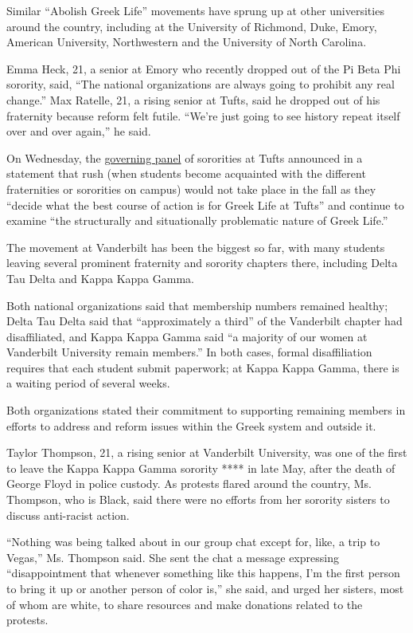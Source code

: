 Similar ``Abolish Greek Life'' movements have sprung up at other
universities around the country, including at the University of
Richmond, Duke, Emory, American University, Northwestern and the
University of North Carolina.

Emma Heck, 21, a senior at Emory who recently dropped out of the Pi Beta
Phi sorority, said, ``The national organizations are always going to
prohibit any real change.'' Max Ratelle, 21, a rising senior at Tufts,
said he dropped out of his fraternity because reform felt futile.
``We're just going to see history repeat itself over and over again,''
he said.

On Wednesday, the
\href{https://www.instagram.com/p/CDPpAbbFJSc/}{governing panel} of
sororities at Tufts announced in a statement that rush (when students
become acquainted with the different fraternities or sororities on
campus) would not take place in the fall as they ``decide what the best
course of action is for Greek Life at Tufts'' and continue to examine
``the structurally and situationally problematic nature of Greek Life.''

The movement at Vanderbilt has been the biggest so far, with many
students leaving several prominent fraternity and sorority chapters
there, including Delta Tau Delta and Kappa Kappa Gamma.

Both national organizations said that membership numbers remained
healthy; Delta Tau Delta said that ``approximately a third'' of the
Vanderbilt chapter had disaffiliated, and Kappa Kappa Gamma said ``a
majority of our women at Vanderbilt University remain members.'' In both
cases, formal disaffiliation requires that each student submit
paperwork; at Kappa Kappa Gamma, there is a waiting period of several
weeks.

Both organizations stated their commitment to supporting remaining
members in efforts to address and reform issues within the Greek system
and outside it.

Taylor Thompson, 21, a rising senior at Vanderbilt University, was one
of the first to leave the Kappa Kappa Gamma sorority **** in late May,
after the death of George Floyd in police custody. As protests flared
around the country, Ms. Thompson, who is Black, said there were no
efforts from her sorority sisters to discuss anti-racist action.

``Nothing was being talked about in our group chat except for, like, a
trip to Vegas,'' Ms. Thompson said. She sent the chat a message
expressing ``disappointment that whenever something like this happens,
I'm the first person to bring it up or another person of color is,'' she
said, and urged her sisters, most of whom are white, to share resources
and make donations related to the protests.

